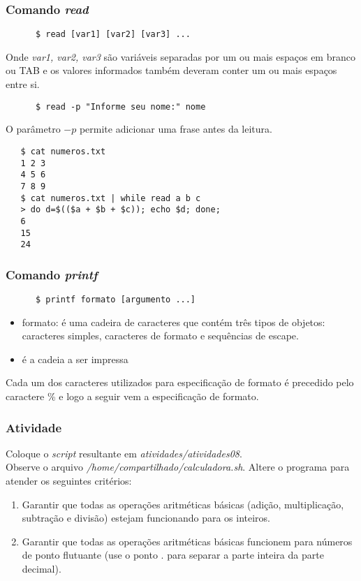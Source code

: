 \documentclass{beamer}
\begin{document}
   \begin{frame}[fragile]
      \frametitle{Comando \textit{read}}
      \begin{verbatim}
      $ read [var1] [var2] [var3] ... 
      \end{verbatim}
      Onde \textit{var1, var2, var3} são variáveis separadas por um ou mais espaços em branco ou TAB e os valores informados também deveram conter um ou mais espaços entre si. 
      \begin{verbatim}
      $ read -p "Informe seu nome:" nome 
      \end{verbatim}
      O parâmetro $-p$ permite adicionar uma frase antes da leitura.
\end{frame}

   \begin{frame}[fragile]
   \begin{verbatim}
   $ cat numeros.txt 
   1 2 3
   4 5 6
   7 8 9
   $ cat numeros.txt | while read a b c
   > do d=$(($a + $b + $c)); echo $d; done;
   6
   15
   24
   \end{verbatim}
\end{frame}

   \begin{frame}[fragile]
      \frametitle{Comando \textit{printf}}
      \begin{verbatim}	   
      $ printf formato [argumento ...] 
      \end{verbatim}
      \begin{itemize}
         \item formato: é uma cadeira de caracteres que contém três tipos de objetos: caracteres simples, caracteres de formato e sequências de escape.
	 \item é a cadeia a ser impressa
      \end{itemize}
      Cada um dos caracteres utilizados para especificação de formato é precedido pelo caractere \% e logo a seguir vem a especificação de formato.
\end{frame}

   \begin{frame}
      \frametitle{Atividade}
      Coloque o \textit{script} resultante em \textit{atividades/atividades08}. \\
      Observe o arquivo \textit{/home/compartilhado/calculadora.sh}. Altere o programa para atender os seguintes critérios:
      \begin{enumerate}
         \item Garantir que todas as operações aritméticas básicas (adição, multiplicação, subtração e divisão) estejam funcionando para os inteiros.
	 \item Garantir que todas as operações aritméticas básicas funcionem para números de ponto flutuante (use o ponto . para separar a parte inteira da parte decimal). 
      \end{enumerate}
   \end{frame}
\end{document}
